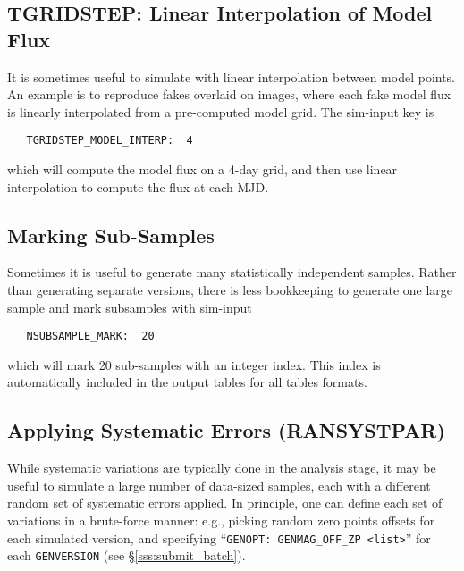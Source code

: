 \documentclass[12pt]{article}
\begin{document}
   \clearpage
   \subsection{TGRIDSTEP: Linear Interpolation of Model Flux}
   \label{ssec:TGRIDSTEP}

It is sometimes useful to simulate with linear interpolation
between model points. An example is to reproduce fakes overlaid
on images, where each fake model flux is linearly interpolated
from a pre-computed model grid.  The sim-input key is
%
\begin{verbatim}
   TGRIDSTEP_MODEL_INTERP:  4  
\end{verbatim}
% 
which will compute the model flux on a 4-day grid,
and then use linear interpolation to compute the flux
at each MJD.

   \subsection{Marking Sub-Samples}
   \label{ssec:subsamples}

Sometimes it is useful to generate many statistically independent 
samples. Rather than generating separate versions, there is less
bookkeeping to generate one large sample and mark subsamples with
sim-input
\begin{verbatim}
   NSUBSAMPLE_MARK:  20
\end{verbatim}
%
which will mark 20 sub-samples with an integer index.
This index is automatically included in the output tables
for all tables formats.


  \clearpage
   \subsection{Applying Systematic Errors (RANSYSTPAR) }
   \label{ssec:RANSYSTPAR}

While systematic variations are typically done in the analysis stage,
it may be useful to simulate a large number of data-sized samples,
each with a different random set of systematic errors applied.
In principle, one can define each set of variations in a brute-force manner:
e.g., picking random zero points offsets for each simulated version,
and specifying ``{\tt GENOPT: GENMAG\_OFF\_ZP <list>}'' for each
{\tt GENVERSION} (see \S\ref{sss:submit_batch}).
\end{document}
